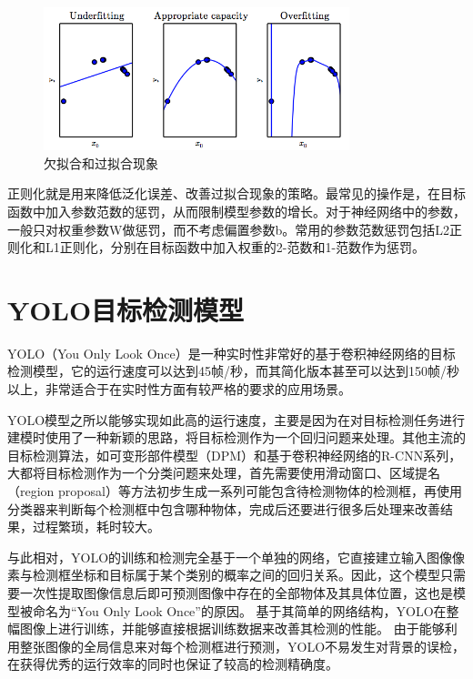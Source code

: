 \begin{figure}[htb] %
	\centering
	\includegraphics[width=3.5in]{figures/3_1_欠拟合和过拟合}
	\caption{欠拟合和过拟合现象} \label{fig:3_1_欠拟合和过拟合}
\end{figure}

正则化就是用来降低泛化误差、改善过拟合现象的策略。最常见的操作是，在目标函数中加入参数范数的惩罚，从而限制模型参数的增长。对于神经网络中的参数，一般只对权重参数W做惩罚，而不考虑偏置参数b。常用的参数范数惩罚包括L2正则化和L1正则化，分别在目标函数中加入权重的2-范数和1-范数作为惩罚。



\section{YOLO目标检测模型}
YOLO（You Only Look Once）\cite{redmon2016you}是一种实时性非常好的基于卷积神经网络的目标检测模型，它的运行速度可以达到45帧/秒，而其简化版本甚至可以达到150帧/秒以上，非常适合于在实时性方面有较严格的要求的应用场景。

YOLO模型之所以能够实现如此高的运行速度，主要是因为在对目标检测任务进行建模时使用了一种新颖的思路，将目标检测作为一个回归问题来处理。其他主流的目标检测算法，如可变形部件模型（DPM）和基于卷积神经网络的R-CNN系列，大都将目标检测作为一个分类问题来处理，首先需要使用滑动窗口、区域提名（region proposal）等方法初步生成一系列可能包含待检测物体的检测框，再使用分类器来判断每个检测框中包含哪种物体，完成后还要进行很多后处理来改善结果，过程繁琐，耗时较大。

与此相对，YOLO的训练和检测完全基于一个单独的网络，它直接建立输入图像像素与检测框坐标和目标属于某个类别的概率之间的回归关系。因此，这个模型只需要一次性提取图像信息后即可预测图像中存在的全部物体及其具体位置，这也是模型被命名为“You Only Look Once”的原因。
基于其简单的网络结构，YOLO在整幅图像上进行训练，并能够直接根据训练数据来改善其检测的性能。
由于能够利用整张图像的全局信息来对每个检测框进行预测，YOLO不易发生对背景的误检，在获得优秀的运行效率的同时也保证了较高的检测精确度。


